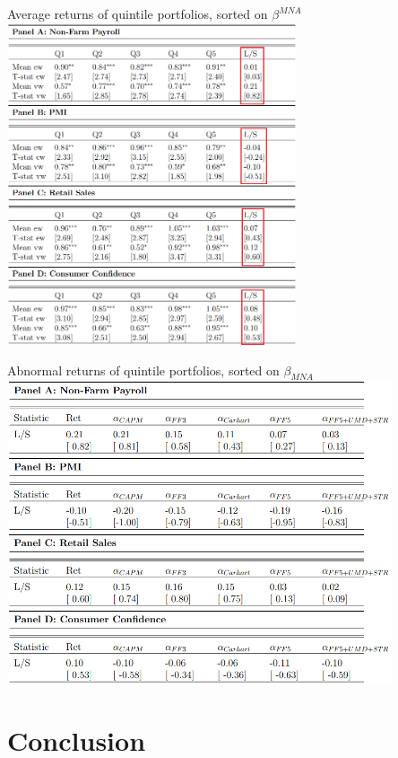 \documentclass{beamer}
\begin{document}
\begin{frame}{Average returns of quintile portfolios, sorted on $\beta^{MNA}$}
\centering
\includegraphics[width=0.64\textwidth]{images/dp_t13.png}  
\end{frame}


\begin{frame}{Abnormal returns of quintile portfolios, sorted on $\beta_{MNA}$}
\centering
\includegraphics[width=0.85\textwidth]{images/dp_t14.png}  
\end{frame}



\section{Conclusion}
\subsection{}
\end{document}
